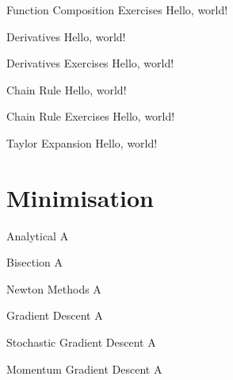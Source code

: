   \begin{frame}{Function Composition Exercises}
    Hello, world!
  \end{frame}

  \begin{frame}{Derivatives}
    Hello, world!
  \end{frame}

  \begin{frame}{Derivatives Exercises}
    Hello, world!
  \end{frame}

  \begin{frame}{Chain Rule}
    Hello, world!
  \end{frame}

  \begin{frame}{Chain Rule Exercises}
    Hello, world!
  \end{frame}

  \begin{frame}{Taylor Expansion}
    Hello, world!
  \end{frame}

  \section{Minimisation}
  \begin{frame}{Analytical}
    A
  \end{frame}

  \begin{frame}{Bisection}
    A
  \end{frame}

  \begin{frame}{Newton Methods}
    A
  \end{frame}

  \begin{frame}{Gradient Descent}
    A
  \end{frame}

  \begin{frame}{Stochastic Gradient Descent}
    A
  \end{frame}

  \begin{frame}{Momentum Gradient Descent}
    A
  \end{frame}

